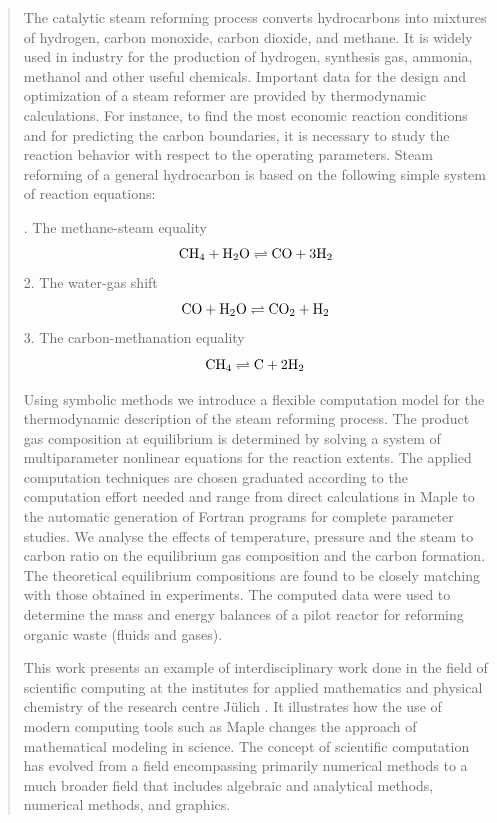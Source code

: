 \documentclass[12pt]{article}
\begin{document}
\begin{abstract}
The catalytic steam reforming process converts hydrocarbons into mixtures of
hydrogen, carbon monoxide, carbon dioxide, and methane. It is widely
used in industry for the production of hydrogen, synthesis gas, ammonia,
methanol and other useful chemicals.
Important data for the design and optimization
of a steam reformer are provided by thermodynamic calculations.
For instance, to find the most economic reaction conditions and for
predicting the carbon boundaries, it is necessary to study
the reaction behavior with respect to the
operating parameters. Steam reforming of a general hydrocarbon
is based on the following simple system of reaction equations:

\medskip

. The methane-steam equality
$${\rm CH_{4}+H_{2}O} \rightleftharpoons {\rm CO+3H_{2}}$$
2. The water-gas shift
$${\rm CO+H_{2}O} \rightleftharpoons {\rm CO_{2}+H_{2}}$$
3. The carbon-methanation equality
$${\rm CH_{4}} \rightleftharpoons {\rm C+2H_{2}}$$

\medskip
\noindent

Using symbolic methods we introduce a flexible computation model
for the thermodynamic description of the steam reforming process.
The product gas composition at equilibrium is determined by solving
a system of multiparameter nonlinear equations for the reaction extents.
The applied computation techniques are chosen graduated according to
the computation effort needed and range from direct calculations
in Maple to the automatic generation of Fortran programs for complete
parameter studies.
We analyse the effects of temperature, pressure and the
steam to carbon ratio on the equilibrium gas composition and
the carbon formation.
The theoretical equilibrium compositions are found to be closely
matching with those obtained in experiments.
The computed data were used to determine the mass and energy balances
of a pilot reactor for reforming organic waste (fluids and gases).

This work presents an example of interdisciplinary work done
in the field of  scientific computing
at the institutes for applied mathematics and physical chemistry
of the research centre J\"ulich . It illustrates how the use of modern
computing tools such as Maple changes the approach of mathematical
modeling in science. The concept of scientific computation has evolved
from a field encompassing primarily numerical methods to a much broader
field that includes algebraic and analytical methods, numerical methods,
and graphics.

\end{abstract}
\end{document}
